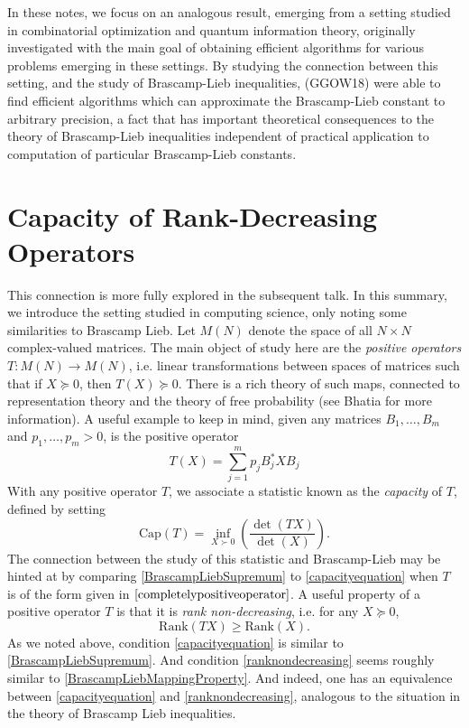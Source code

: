 \documentclass[12pt]{article}
\begin{document}
In these notes, we focus on an analogous result, emerging from a setting studied in combinatorial optimization and quantum information theory, originally investigated with the main goal of obtaining efficient algorithms for various problems emerging in these settings. By studying the connection between this setting, and the study of Brascamp-Lieb inequalities, (GGOW18) were able to find efficient algorithms which can approximate the Brascamp-Lieb constant to arbitrary precision, a fact that has important theoretical consequences to the theory of Brascamp-Lieb inequalities independent of practical application to computation of particular Brascamp-Lieb constants.

\section{Capacity of Rank-Decreasing Operators}

This connection is more fully explored in the subsequent talk. In this summary, we introduce the setting studied in computing science, only noting some similarities to Brascamp Lieb. Let $M(N)$ denote the space of all $N \times N$ complex-valued matrices. The main object of study here are the \emph{positive operators} $T: M(N) \to M(N)$, i.e. linear transformations between spaces of matrices such that if $X \succeq 0$, then $T(X) \succeq 0$.  There is a rich theory of such maps, connected to representation theory and the theory of free probability (see Bhatia for more information). A useful example to keep in mind, given any matrices $B_1,\dots, B_m$ and $p_1,\dots,p_m > 0$, is the positive operator
%
\begin{equation} \label{completelypositiveoperator}
    T(X) = \sum_{j = 1}^m p_j B_j^* X B_j
\end{equation}
%
With any positive operator $T$, we associate a statistic known as the \emph{capacity} of $T$, defined by setting
%
\begin{equation} \label{capacityequation}
    \text{Cap}(T) = \inf_{X \succ 0} \left( \frac{\det(TX)}{\det(X)} \right).
\end{equation}
%
The connection between the study of this statistic and Brascamp-Lieb may be hinted at by comparing \eqref{BrascampLiebSupremum} to \eqref{capacityequation} when $T$ is of the form given in $\eqref{completelypositiveoperator}$. A useful property of a positive operator $T$ is that it is \emph{rank non-decreasing}, i.e. for any $X \succeq 0$,
%
\begin{equation} \label{ranknondecreasing}
    \text{Rank}(TX) \geq \text{Rank}(X).
\end{equation}
%
As we noted above, condition \eqref{capacityequation} is similar to \eqref{BrascampLiebSupremum}. And condition \eqref{ranknondecreasing} seems roughly similar to \eqref{BrascampLiebMappingProperty}. And indeed, one has an equivalence between \eqref{capacityequation} and \eqref{ranknondecreasing}, analogous to the situation in the theory of Brascamp Lieb inequalities.
\end{document}
